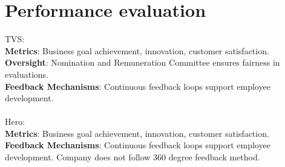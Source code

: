 \section{Performance evaluation}
TVS:\\
\textbf{Metrics}: Business goal achievement, innovation, customer satisfaction.\\
\textbf{Oversight}: Nomination and Remuneration Committee ensures fairness in evaluations.\\
\textbf{Feedback Mechanisms}: Continuous feedback loops support employee development.\\\\
Hero:\\
\textbf{Metrics}: Business goal achievement, innovation, customer satisfaction.\\
\textbf{Feedback Mechanisms}: Continuous feedback loops support employee development. Company does not follow 360 degree feedback method.